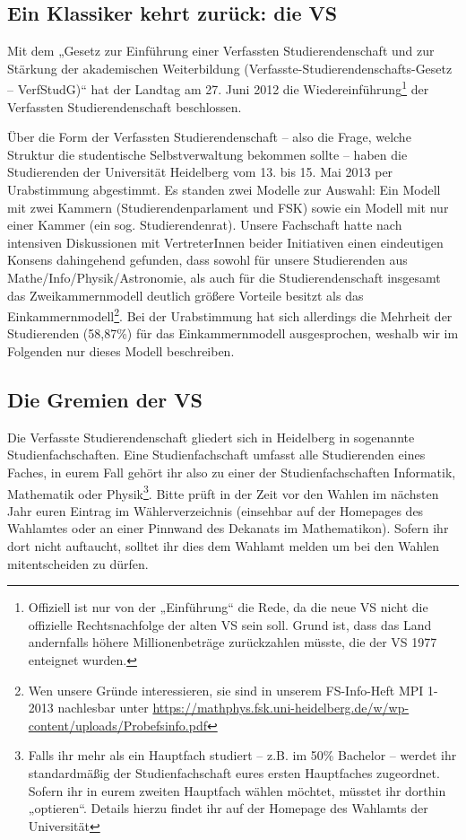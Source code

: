 \subsection{Ein Klassiker kehrt zurück: die VS}

Mit dem „Gesetz zur Einführung einer Verfassten Studierendenschaft und zur
Stärkung der akademischen Weiterbildung
(Ver\-fass\-te-Stu\-dier\-en\-den\-schafts-Ge\-setz -- VerfStudG)“ hat der
Landtag am 27. Juni 2012 die Wiedereinführung\footnote{Offiziell ist nur von
der „Einführung“ die Rede, da die neue VS nicht die offizielle Rechtsnachfolge
der alten VS sein soll.  Grund ist, dass das Land andernfalls höhere
Millionenbeträge zurückzahlen müsste, die der VS 1977 enteignet wurden.} der
Verfassten Studierendenschaft beschlossen.

Über die Form der Verfassten Studierendenschaft -- also die Frage, welche
Struktur die studentische Selbstverwaltung bekommen sollte -- haben die
Studierenden der Universität Heidelberg vom 13. bis 15. Mai 2013 per
Urabstimmung abgestimmt.  Es standen zwei Modelle zur Auswahl: Ein Modell mit
zwei Kammern (Studierendenparlament und FSK) sowie ein Modell mit nur einer
Kammer (ein sog. Studierendenrat). Unsere Fachschaft hatte nach intensiven
Diskussionen mit VertreterInnen beider Initiativen einen eindeutigen Konsens
dahingehend gefunden, dass sowohl für unsere Studierenden aus
Mathe/Info/Physik/Astronomie, als auch für die Studierendenschaft insgesamt das
Zweikammernmodell deutlich größere Vorteile besitzt als das
Einkammernmodell\footnote{Wen unsere Gründe interessieren, sie sind in unserem
FS-Info-Heft MPI 1-2013 nachlesbar unter
\url{https://mathphys.fsk.uni-heidelberg.de/w/wp-content/uploads/Probefsinfo.pdf}}.
Bei der Urabstimmung hat sich allerdings die Mehrheit der Studierenden
(58,87\%) für das Einkammernmodell ausgesprochen, weshalb wir im Folgenden nur
dieses Modell beschreiben.

\subsection{Die Gremien der VS}

Die Verfasste Studierendenschaft gliedert sich in Heidelberg in sogenannte
Studienfachschaften. Eine Studienfachschaft umfasst alle Studierenden eines
Faches, in eurem Fall gehört ihr also zu einer der Studienfachschaften
Informatik, Mathematik oder Physik\footnote{Falls ihr mehr als ein Hauptfach
studiert -- z.B. im 50\% Bachelor -- werdet ihr standardmäßig der
Studienfachschaft eures ersten Hauptfaches zugeordnet.  Sofern ihr in eurem
zweiten Hauptfach wählen möchtet, müsstet ihr dorthin „optieren“.  Details
hierzu findet ihr auf der Homepage des Wahlamts der Universität}.  Bitte prüft
in der Zeit vor den Wahlen im nächsten Jahr euren Eintrag im Wählerverzeichnis
(einsehbar auf der Homepages des Wahlamtes oder an einer Pinnwand des Dekanats
im Mathematikon). Sofern ihr dort nicht auftaucht, solltet ihr dies dem Wahlamt
melden um bei den Wahlen mitentscheiden zu dürfen.

